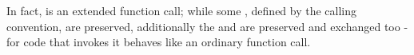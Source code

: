 In fact, \cc is an extended function call; while some , defined by the calling convention, are preserved, additionally the
 and  are preserved and exchanged
too - for code that invokes \cc it behaves like an ordinary function call.
